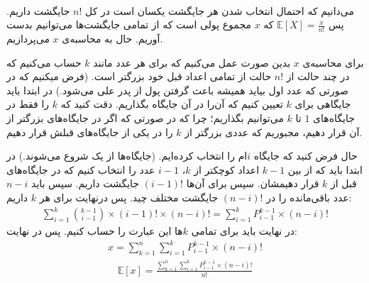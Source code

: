 \\
می‌دانیم که احتمال انتخاب شدن هر جایگشت یکسان است در کل
$n!$
جایگشت داریم. پس
$\mathbb{E}[X] = \frac{x}{n!}$
که $x$ مجموع پولی است که از تمامی جایگشت‌ها می‌توانیم بدست آوریم.
حال به محاسبه‌ی
$x$
می‌پردازیم.

برای محاسبه‌ی
$x$
بدین صورت عمل می‌کنیم که برای هر عدد مانند
$k$
حساب می‌کنیم که در چند حالت از
$n!$
حالت از تمامی اعداد قبل خود بزرگتر است.
(فرض میکنیم که در صورتی که عدد اول بیاید همیشه باعث گرفتن پول از پدر علی می‌شود.)
در ابتدا باید جایگاهی برای
$k$
تعیین کنیم که آن‌را در آن جایگاه بگذاریم. دقت کنید که
$k$
را فقط در جایگاه‌های
$1$
تا
$k$
می‌توانیم بگذاریم؛ چرا که در صورتی که اگر در جایگاه‌های بزرگتر از آن قرار دهیم، مجبوریم که عددی بزرگتر از
$k$
را در یکی از جایگاه‌های قبلش قرار دهیم.

حال فرض کنید که جایگاه
$i$ام
را انتخاب کرده‌ایم. (جایگاه‌ها از یک شروع می‌شوند.)
در ابتدا باید که از بین
$k-1$
اعداد کوچکتر از $k$،
$i-1$
عدد را انتخاب کنیم که در جایگاه‌های قبل از
$k$
قرار دهیمشان. سپس برای آن‌ها
$(i-1)!$
جایگشت داریم. سپس باید
$n-i$
عدد باقی‌مانده را در
$(n-i)!$
جایگشت مختلف چید.
پس درنهایت برای هر
$k$
داریم:
\begin{gather*}
    \sum^k_{i=1} {k-1 \choose i-1} \times (i - 1)! \times (n - i)! = 
    \sum^k_{i=1} P^{k-1}_{i - 1} \times (n - i)!
\end{gather*}
در نهایت باید برای تمامی
$k$ها
این عبارت را حساب کنیم. پس در نهایت:
\begin{gather*}
    x = \sum^n_{k=1} \sum^k_{i=1} P^{k-1}_{i - 1} \times (n - i)!
\end{gather*}
\begin{gather*}
    \mathbb{E}[x] = \frac{\sum^n_{k=1} \sum^k_{i=1} P^{k-1}_{i - 1} \times (n - i)!}{n!}
\end{gather*}